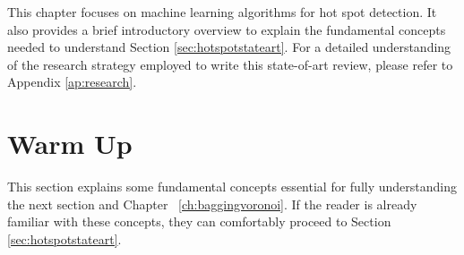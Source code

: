 This chapter focuses on machine learning algorithms for hot spot detection. It also provides a brief introductory overview to explain the fundamental concepts needed to understand Section \ref{sec:hotspotstateart}. For a detailed understanding of the research strategy employed to write this state-of-art review, please refer to Appendix \ref{ap:research}. 

\section{Warm Up}
\label{sec:introperritardati}
This section explains some fundamental concepts essential for fully understanding the next section and Chapter ~\ref{ch:baggingvoronoi}. If the reader is already familiar with these concepts, they can comfortably proceed to Section \ref{sec:hotspotstateart}. 

